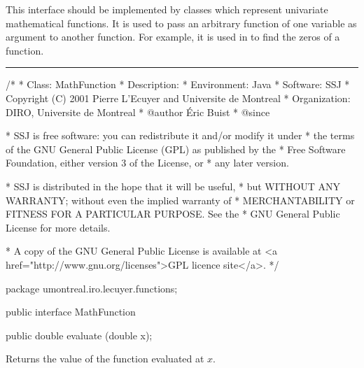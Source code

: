
This interface should be implemented by classes which represent univariate
mathematical functions. It is used to pass an arbitrary function of one
variable as argument to another function. For example, it is used
in  to find
 the zeros of a function.

\bigskip\hrule\bigskip

\begin{code}
\begin{hide}
/*
 * Class:        MathFunction
 * Description:
 * Environment:  Java
 * Software:     SSJ
 * Copyright (C) 2001  Pierre L'Ecuyer and Universite de Montreal
 * Organization: DIRO, Universite de Montreal
 * @author       Éric Buist
 * @since

 * SSJ is free software: you can redistribute it and/or modify it under
 * the terms of the GNU General Public License (GPL) as published by the
 * Free Software Foundation, either version 3 of the License, or
 * any later version.

 * SSJ is distributed in the hope that it will be useful,
 * but WITHOUT ANY WARRANTY; without even the implied warranty of
 * MERCHANTABILITY or FITNESS FOR A PARTICULAR PURPOSE.  See the
 * GNU General Public License for more details.

 * A copy of the GNU General Public License is available at
   <a href="http://www.gnu.org/licenses">GPL licence site</a>.
 */
\end{hide}
package umontreal.iro.lecuyer.functions;

public interface MathFunction\begin{hide} {\end{hide}
\end{code}
\begin{code}

   public double evaluate (double x);
\end{code}
\begin{tabb}
   Returns the value of the function evaluated at $x$.
\end{tabb}
\begin{htmlonly}
\end{htmlonly}
\begin{code}\begin{hide}
}\end{hide}
\end{code}
